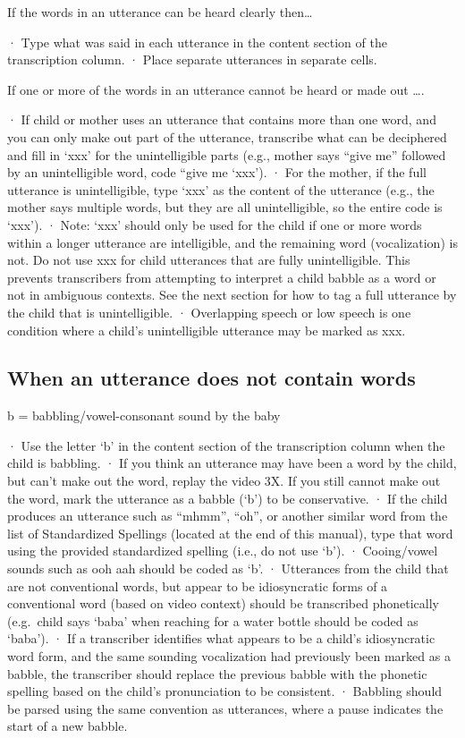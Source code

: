 \documentclass[
  12pt,
]{book}
\begin{document}
If the words in an utterance can be heard clearly then\ldots{}

· Type what was said in each utterance in the content section of the transcription column.
· Place separate utterances in separate cells.

If one or more of the words in an utterance cannot be heard or made out \ldots.

· If child or mother uses an utterance that contains more than one word, and you can only make out part of the utterance, transcribe what can be deciphered and fill in `xxx' for the unintelligible parts (e.g., mother says ``give me'' followed by an unintelligible word, code ``give me `xxx').
· For the mother, if the full utterance is unintelligible, type `xxx' as the content of the utterance (e.g., the mother says multiple words, but they are all unintelligible, so the entire code is `xxx').
· Note: `xxx' should only be used for the child if one or more words within a longer utterance are intelligible, and the remaining word (vocalization) is not. Do not use xxx for child utterances that are fully unintelligible. This prevents transcribers from attempting to interpret a child babble as a word or not in ambiguous contexts. See the next section for how to tag a full utterance by the child that is unintelligible.
· Overlapping speech or low speech is one condition where a child's unintelligible utterance may be marked as xxx.

\hypertarget{when-an-utterance-does-not-contain-words}{%
\subsection{When an utterance does not contain words}\label{when-an-utterance-does-not-contain-words}}

b = babbling/vowel-consonant sound by the baby

· Use the letter `b' in the content section of the transcription column when the child is babbling.
· If you think an utterance may have been a word by the child, but can't make out the word, replay the video 3X. If you still cannot make out the word, mark the utterance as a babble (`b') to be conservative.
· If the child produces an utterance such as ``mhmm'', ``oh'', or another similar word from the list of Standardized Spellings (located at the end of this manual), type that word using the provided standardized spelling (i.e., do not use `b').
· Cooing/vowel sounds such as ooh aah should be coded as `b'.
· Utterances from the child that are not conventional words, but appear to be idiosyncratic forms of a conventional word (based on video context) should be transcribed phonetically (e.g.~child says `baba' when reaching for a water bottle should be coded as `baba').
· If a transcriber identifies what appears to be a child's idiosyncratic word form, and the same sounding vocalization had previously been marked as a babble, the transcriber should replace the previous babble with the phonetic spelling based on the child's pronunciation to be consistent.
· Babbling should be parsed using the same convention as utterances, where a pause indicates the start of a new babble.
\end{document}
